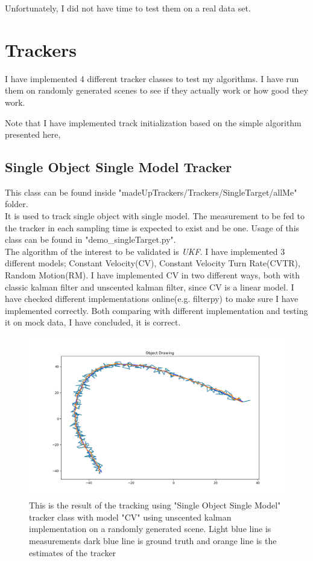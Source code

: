\documentclass[peerreview]{IEEEtran}
\begin{document}
Unfortunately, I did not have time to test them on a real data set.

\section{Trackers}
I have implemented 4 different tracker classes to test my algorithms. I have run them on randomly generated scenes to see if they actually work or how good they work.

Note that I have implemented track initialization based on the simple algorithm presented here, \cite[p.247]{BYL01}

\subsection{Single Object Single Model Tracker}

This class can be found inside "madeUpTrackers/Trackers/SingleTarget/allMe" folder. \\

It is used to track single object with single model. The measurement to be fed to the tracker in each sampling time is expected to exist and be one. Usage of this class can be found in "demo\_singleTarget.py". \\

The algorithm of the interest to be validated is \emph{UKF}. I have implemented 3 different models; Constant Velocity(CV), Constant Velocity Turn Rate(CVTR), Random Motion(RM). I have implemented CV in two different ways, both with classic kalman filter and  unscented kalman filter, since CV is a linear model. I have checked different implementations online(e.g. filterpy) to make sure I have implemented correctly. Both comparing with different implementation and testing it on mock data, I have concluded, it is correct.

\begin{figure}[htbp]
\centerline{\includegraphics[scale=.3]{singleTarget_singleModel_test.png}}
\caption{This is the result of the tracking using "Single Object Single Model" tracker class with model "CV" using unscented kalman implementation on a randomly generated scene. Light blue line is measurements dark blue line is ground truth and orange line is the estimates of the tracker}
\label{fig}
\end{figure}
\end{document}
